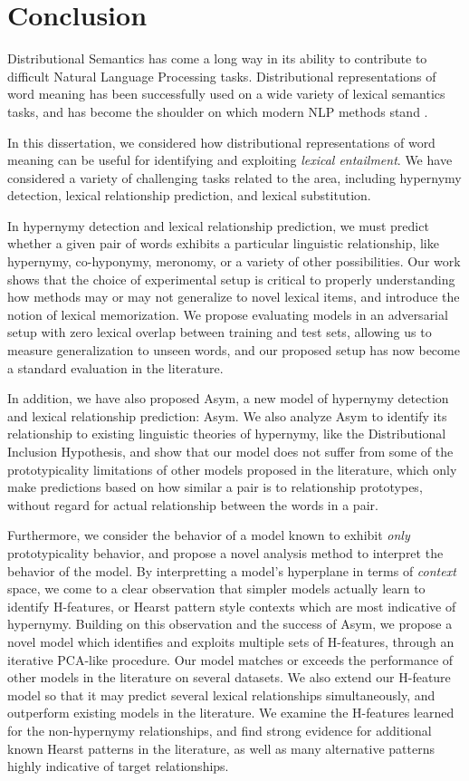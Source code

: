 \chapter{Conclusion}
\label{ch:conclusion}

Distributional Semantics has come a long way in its ability to contribute
to difficult Natural Language Processing tasks. Distributional representations
of word meaning has been successfully used on a wide variety of lexical semantics
tasks, and has become the shoulder on which modern NLP methods stand
\cite{goldberg:2016:jair}.

In this dissertation, we considered how distributional representations of word
meaning can be useful for identifying and exploiting {\em lexical entailment}.
We have considered a variety of challenging tasks related to the area,
including hypernymy detection, lexical relationship prediction, and lexical
substitution.

In hypernymy detection and lexical relationship prediction, we must predict
whether a given pair of words exhibits a particular linguistic relationship,
like hypernymy, co-hyponymy, meronomy, or a variety of other possibilities.
Our work shows that the choice of experimental setup is critical to properly
understanding how methods may or may not generalize to novel lexical items,
and introduce the notion of lexical memorization. We propose evaluating models
in an adversarial setup with zero lexical overlap between training and test
sets, allowing us to measure generalization to unseen words, and our proposed
setup has now become a standard evaluation in the literature.

In addition, we have also proposed Asym, a new model of hypernymy detection and
lexical relationship prediction: Asym. We also analyze Asym to identify
its relationship to existing linguistic theories of hypernymy, like the
Distributional Inclusion Hypothesis, and show that our model does not suffer
from some of the prototypicality limitations of other models proposed in the
literature, which only make predictions based on how similar a pair is to
relationship prototypes, without regard for actual relationship between the
words in a pair.

Furthermore, we consider the behavior of a model known to exhibit {\em only}
prototypicality behavior, and propose a novel analysis method to interpret the
behavior of the model. By interpretting a model's hyperplane in terms of {\em
context} space, we come to a clear observation that simpler models actually
learn to identify H-features, or Hearst pattern style contexts which are most
indicative of hypernymy. Building on this observation and the success of
Asym, we propose a novel model which identifies and exploits multiple sets of
H-features, through an iterative PCA-like procedure. Our model matches or
exceeds the performance of other models in the literature on several datasets.
We also extend our H-feature model so that it may predict several lexical
relationships simultaneously, and outperform existing models in the literature.
We examine the H-features learned for the non-hypernymy relationships, and
find strong evidence for additional known Hearst patterns in the literature,
as well as many alternative patterns highly indicative of target relationships.

